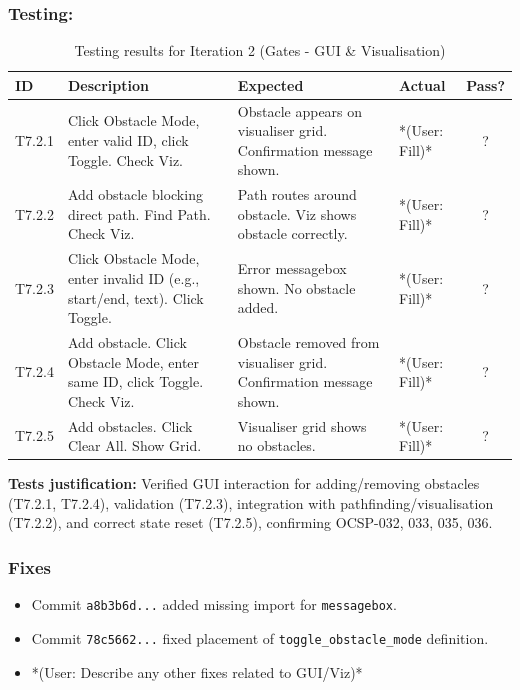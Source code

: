 \subsubsection{Testing:} %
\begin{table}[htbp]
	\centering
	\begin{tabularx}{\textwidth}{|l|X|p{4.5cm}|p{1.5cm}|c|}
		\hline
		\textbf{ID} & \textbf{Description} & \textbf{Expected} & \textbf{Actual} & \textbf{Pass?} \\
		\hline
		T7.2.1 & Click Obstacle Mode, enter valid ID, click Toggle. Check Viz. & Obstacle appears on visualiser grid. Confirmation message shown. & *(User: Fill)* & ? \\
		\hline
		T7.2.2 & Add obstacle blocking direct path. Find Path. Check Viz. & Path routes around obstacle. Viz shows obstacle correctly. & *(User: Fill)* & ? \\
		\hline
		T7.2.3 & Click Obstacle Mode, enter invalid ID (e.g., start/end, text). Click Toggle. & Error messagebox shown. No obstacle added. & *(User: Fill)* & ? \\
		\hline
		T7.2.4 & Add obstacle. Click Obstacle Mode, enter same ID, click Toggle. Check Viz. & Obstacle removed from visualiser grid. Confirmation message shown. & *(User: Fill)* & ? \\
        \hline
        T7.2.5 & Add obstacles. Click Clear All. Show Grid. & Visualiser grid shows no obstacles. & *(User: Fill)* & ? \\
		\hline
	\end{tabularx}
	\caption{Testing results for Iteration 2 (Gates - GUI \& Visualisation)}
\end{table}
\textbf{Tests justification:} Verified GUI interaction for adding/removing obstacles (T7.2.1, T7.2.4), validation (T7.2.3), integration with pathfinding/visualisation (T7.2.2), and correct state reset (T7.2.5), confirming OCSP-032, 033, 035, 036.

\subsubsection{Fixes}
\begin{itemize}
    \item Commit \verb|a8b3b6d...| added missing import for \verb|messagebox|.
	\item Commit \verb|78c5662...| fixed placement of \verb|toggle_obstacle_mode| definition.
	\item *(User: Describe any other fixes related to GUI/Viz)*
\end{itemize}

